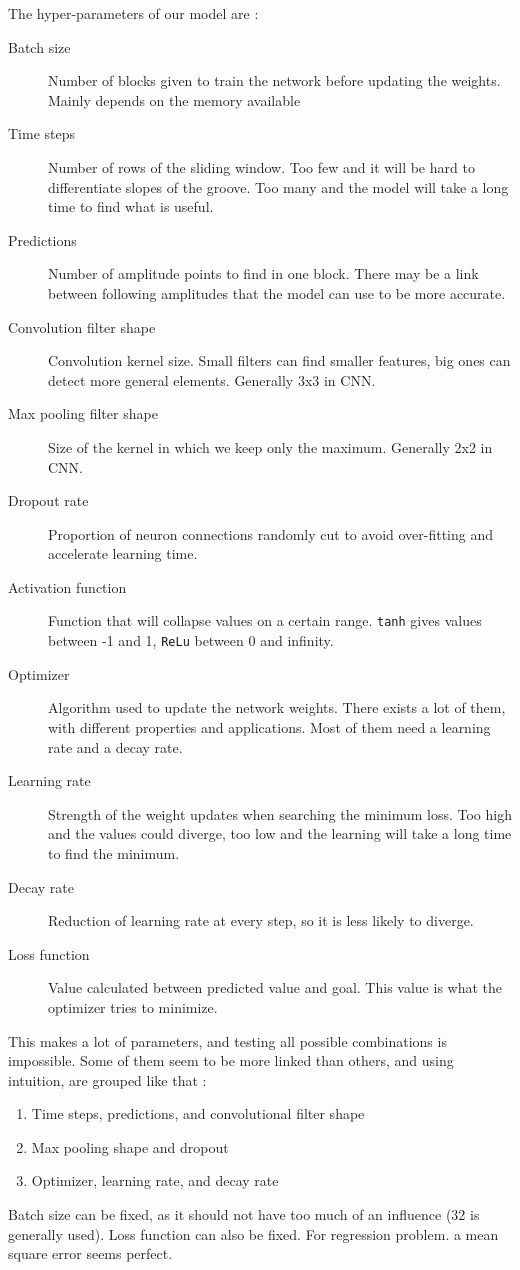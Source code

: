 \documentclass[12pt, twoside]{article}
\begin{document}
The hyper-parameters of our model are :
\begin{description}
	\item[Batch size] Number of blocks given to train the network before updating the weights. Mainly depends on the memory available
	\item[Time steps] Number of rows of the sliding window. Too few and it will be hard to differentiate slopes of the groove. Too many and the model will take a long time to find what is useful.
	\item[Predictions] Number of amplitude points to find in one block. There may be a link between following amplitudes that the model can use to be more accurate.
	\item[Convolution filter shape] Convolution kernel size. Small filters can find smaller features, big ones can detect more general elements. Generally 3x3 in CNN.
	\item[Max pooling filter shape] Size of the kernel in which we keep only the maximum. Generally 2x2 in CNN.
	\item[Dropout rate] Proportion of neuron connections randomly cut to avoid over-fitting and accelerate learning time.
	\item[Activation function] Function that will collapse values on a certain range. \texttt{tanh} gives values between -1 and 1, \texttt{ReLu} between 0 and infinity.
	\item[Optimizer] Algorithm used to update the network weights. There exists a lot of them, with different properties and applications. Most of them need a learning rate and a decay rate.
	\item[Learning rate] Strength of the weight updates when searching the minimum loss. Too high and the values could diverge, too low and the learning will take a long time to find the minimum. 
	\item[Decay rate] Reduction of learning rate at every step, so it is less likely to diverge.
	\item[Loss function] Value calculated between predicted value and goal. This value is what the optimizer tries to minimize.
\end{description}

This makes a lot of parameters, and testing all possible combinations is impossible. Some of them seem to be more linked than others, and using intuition, are grouped like that :
\begin{enumerate}
	\item Time steps, predictions, and convolutional filter shape
	\item Max pooling shape and dropout
	\item Optimizer, learning rate, and decay rate
\end{enumerate}
Batch size can be fixed, as it should not have too much of an influence (32 is generally used). Loss function can also be fixed. For regression problem. a mean square error seems perfect.
\end{document}
